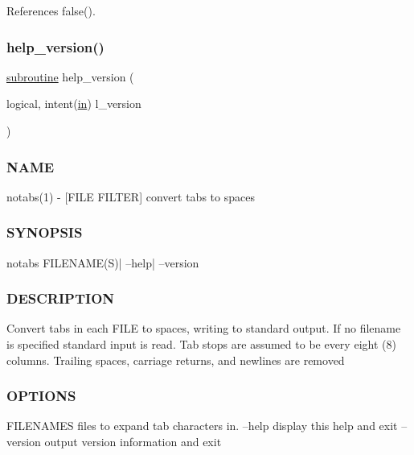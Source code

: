 References false().

\mbox{\label{notabs_8f90_a39c21619b08a3c22f19e2306efd7f766}} 
\subsubsection{\texorpdfstring{help\+\_\+version()}{help\_version()}}
{\footnotesize\ttfamily \hyperlink{M__stopwatch_83_8txt_acfbcff50169d691ff02d4a123ed70482}{subroutine} help\+\_\+version (\begin{DoxyParamCaption}\item[{logical, intent(\hyperlink{M__journal_83_8txt_afce72651d1eed785a2132bee863b2f38}{in})}]{l\+\_\+version }\end{DoxyParamCaption})}



\subsubsection*{N\+A\+ME}

notabs(1) -\/ \mbox{[}F\+I\+LE F\+I\+L\+T\+ER\mbox{]} convert tabs to spaces 

\subsubsection*{S\+Y\+N\+O\+P\+S\+IS}

\begin{DoxyVerb}    notabs FILENAME(S)| --help| --version
\end{DoxyVerb}


\subsubsection*{D\+E\+S\+C\+R\+I\+P\+T\+I\+ON}

Convert tabs in each F\+I\+LE to spaces, writing to standard output. If no filename is specified standard input is read. Tab stops are assumed to be every eight (8) columns. Trailing spaces, carriage returns, and newlines are removed

\subsubsection*{O\+P\+T\+I\+O\+NS}

F\+I\+L\+E\+N\+A\+M\+ES files to expand tab characters in. --help display this help and exit --version output version information and exit

